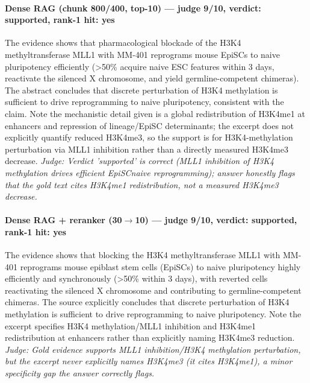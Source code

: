 \documentclass[sigconf, review, anonymous]{acmart}
\begin{document}
\paragraph{Dense RAG (chunk 800/400, top-10) --- judge 9/10, verdict: supported, rank-1 hit: yes}
\noindent The evidence shows that pharmacological blockade of the H3K4 methyltransferase MLL1 with MM-401 reprograms mouse EpiSCs to naive pluripotency efficiently (>50\% acquire naive ESC features within 3 days, reactivate the silenced X chromosome, and yield germline-competent chimeras). The abstract concludes that discrete perturbation of H3K4 methylation is sufficient to drive reprogramming to naive pluripotency, consistent with the claim. Note the mechanistic detail given is a global redistribution of H3K4me1 at enhancers and repression of lineage/EpiSC determinants; the excerpt does not explicitly quantify reduced H3K4me3, so the support is for H3K4-methylation perturbation via MLL1 inhibition rather than a directly measured H3K4me3 decrease.
\noindent\small\textit{Judge: Verdict 'supported' is correct (MLL1 inhibition of H3K4 methylation drives efficient EpiSCnaive reprogramming); answer honestly flags that the gold text cites H3K4me1 redistribution, not a measured H3K4me3 decrease.}
\paragraph{Dense RAG + reranker (30$\to$10) --- judge 9/10, verdict: supported, rank-1 hit: yes}
\noindent The evidence shows that blocking the H3K4 methyltransferase MLL1 with MM-401 reprograms mouse epiblast stem cells (EpiSCs) to naive pluripotency highly efficiently and synchronously (>50\% within 3 days), with reverted cells reactivating the silenced X chromosome and contributing to germline-competent chimeras. The source explicitly concludes that discrete perturbation of H3K4 methylation is sufficient to drive reprogramming to naive pluripotency. Note the excerpt specifies H3K4 methylation/MLL1 inhibition and H3K4me1 redistribution at enhancers rather than explicitly naming H3K4me3 reduction.
\noindent\small\textit{Judge: Gold evidence supports MLL1 inhibition/H3K4 methylation perturbation, but the excerpt never explicitly names H3K4me3 (it cites H3K4me1), a minor specificity gap the answer correctly flags.}
\end{document}
